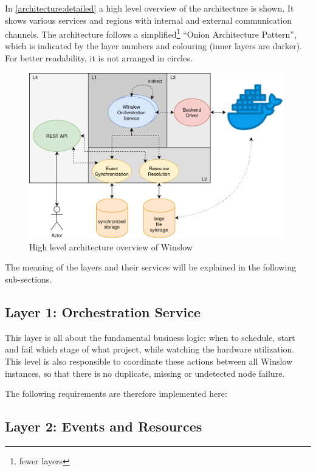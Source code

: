 In \autoref{architecture:detailed} a high level overview of the architecture is shown.
It shows various services and regions with internal and external communication channels.
The architecture follows a simplified\footnote{fewer layers} \enquote{Onion Architecture Pattern}\cite{palermo:onion}, which is indicated by the layer numbers and colouring (inner layers are darker).
For better readability, it is not arranged in circles.


\begin{figure}[H]
	\includegraphics[width=0.99\textwidth]{architecture_detailed.png}
	\centering
	\caption{High level architecture overview of Winslow}
	\label{architecture:detailed}
\end{figure}

The meaning of the layers and their services will be explained in the following sub-sections.

\subsection{Layer 1: Orchestration Service}
\label{analysis:layer_1}

This layer is all about the fundamental business logic: when to schedule, start and fail which stage of what project, while watching the hardware utilization.
This level is also responsible to coordinate these actions between all Winslow instances, so that there is no duplicate, missing or undetected node failure.

The following requirements are therefore implemented here: 

\subsection{Layer 2: Events and Resources}
\label{analysis:layer_2}

